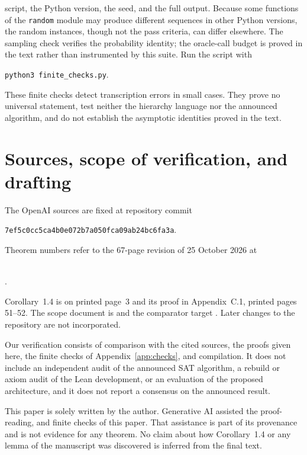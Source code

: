 \documentclass[11pt,reqno]{amsart}
\numberwithin{equation}{section}
\theoremstyle{plain}
\theoremstyle{definition}
\theoremstyle{remark}
\begin{document}
script, the Python version, the seed, and the full output. Because some
functions of the \texttt{random} module may produce different sequences in
other Python versions, the random instances, though not the pass criteria,
can differ elsewhere. The sampling check verifies the probability identity;
the oracle-call budget is proved in the text rather than instrumented by
this suite. Run the script with
\begin{center}\small\texttt{python3 finite\_checks.py}.\end{center}
These finite checks detect transcription errors in small cases. They prove
no universal statement, test neither the hierarchy language nor the
announced algorithm, and do not establish the asymptotic identities proved
in the text.

\section{Sources, scope of verification, and drafting}\label{app:provenance}
The OpenAI sources are fixed at repository commit
\begin{center}\footnotesize\texttt{7ef5c0cc5ca4b0e072b7a050fca09ab24bc6fa3a}.\end{center}
Theorem numbers refer to the 67-page revision of 25 October 2026 at
\begin{center}\footnotesize
{}\\
.
\end{center}
Corollary~1.4 is on printed page~3 and its proof in Appendix~C.1, printed
pages 51--52. The scope document is  and the comparator
target . Later changes
to the repository are not incorporated.

Our verification consists of comparison with the cited sources, the proofs
given here, the finite checks of Appendix~\ref{app:checks}, and compilation.
It does not include an independent audit of the announced SAT algorithm, a
rebuild or axiom audit of the Lean development, or an evaluation of the
proposed architecture, and it does not report a consensus on the announced
result.

This paper is solely written by the author. Generative AI assisted the proof-reading, and finite checks of this paper. That assistance is part of its provenance and is not evidence for any
theorem. No claim about how Corollary~1.4 or any lemma of the manuscript was
discovered is inferred from the final text.
\end{document}

